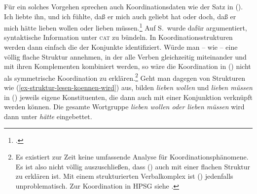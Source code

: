Für ein solches Vorgehen sprechen auch Koordinationsdaten
wie der Satz in ().
\ea
Ich liebte ihn, und ich fühlte, daß er mich auch geliebt hat oder doch, daß er mich
hätte lieben wollen oder lieben müssen.\footnote{
        .
}
\z
Auf S.\,\pageref{page-symmetrische-koordination} wurde dafür argumentiert,
syntaktische Information unter \textsc{cat} zu bündeln. In Koordinationsstrukturen werden
dann einfach die \catwe der Konjunkte identifiziert. Würde man -- wie \zb \citet*{BvN96,BvN98a} --
eine völlig flache Struktur annehmen, in der alle Verben
gleichzeitig miteinander und mit ihren Komplementen kombiniert werden,
so wäre die Koordination in () nicht als symmetrische Koordination zu erklären.\footnote{
        Es existiert zur Zeit keine umfassende Analyse für Koordinationsphänomene. Es ist also
        nicht völlig auszuschließen, dass () auch mit einer flachen Struktur zu erklären ist.
        Mit einem strukturierten Verbalkomplex ist () jedenfalls unproblematisch. Zur
        Koordination in HPSG siehe .%
}
Geht man dagegen von Strukturen wie (\ref{ex-struktur-lesen-koennen-wird}) aus, bilden \emph{lieben wollen}
und \emph{lieben müssen} in () jeweils eigene Konstituenten, die dann auch mit einer Konjunktion
verknüpft werden können. Die gesamte Wortgruppe \emph{lieben wollen oder lieben müssen} wird dann unter
\emph{hätte} eingebettet.


